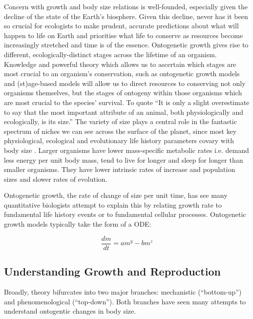 \documentclass[a4paper]{article} %
\begin{document}
        Concern with growth and body size relations is well-founded, especially given the decline of the state of the Earth's biosphere. Given this decline, never has it been so crucial for ecologists to make prudent, accurate predictions about what will happen to life on Earth and prioritise what life to conserve as resources become increasingly stretched and time is of the essence. Ontogenetic growth gives rise to different, ecologically-distinct stages across the lifetime of an organism. Knowledge and powerful theory which allows us to ascertain which stages are most crucial to an organism's conservation, such as ontogenetic growth models and (st)age-based models will allow us to direct resources to conserving not only organisms themselves, but the stages of ontogeny within those organisms which are most crucial to the species' survival. To quote \cite{Bartholomew1981} ``It is only a slight overestimate to say that the most important attribute of an animal, both physiologically and ecologically, is its size.'' The variety of size plays a central role in the fantastic spectrum of niches we can see across the surface of the planet, since most key physiological, ecological and evolutionary life history parameters covary with body size \autocite{peters1983, brown2000-scaling-book,schmidt1984scaling,Marshall2019b}. Larger organisms have lower mass-specific metabolic rates i.e. demand less energy per unit body mass, tend to live for longer and sleep for longer than smaller organisms. They have lower intrinsic rates of increase and population sizes and slower rates of evolution. 

        Ontogenetic growth, the rate of change of size per unit time, has see many quantitative biologists attempt to explain this by relating growth rate to fundamental life history events or to fundamental cellular processes. Ontogenetic growth models typically take the form of a ODE:

        \begin{equation}
            \frac{dm}{dt} = am^y - bm^z
        \end{equation}
                
        \subsection{Understanding Growth and Reproduction}
        Broadly, theory bifurcates into two major branches: mechanistic (``bottom-up'') and phenomenological (``top-down''). Both branches have seen many attempts to understand ontogentic changes in body size.  
        
\end{document}
